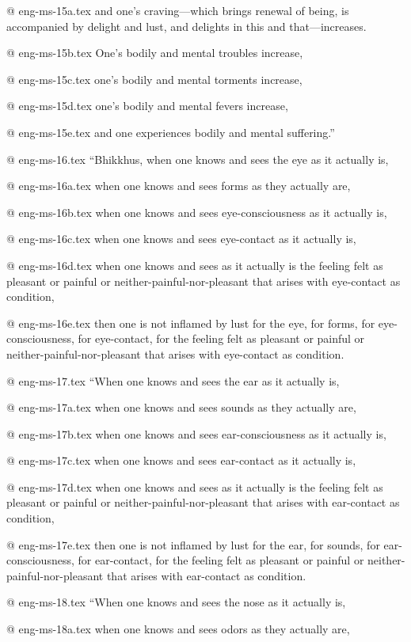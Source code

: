 @ eng-ms-15a.tex
and one’s craving—which brings renewal of being, is accompanied by delight and lust, and delights in this and that—increases.

@ eng-ms-15b.tex
One’s bodily and mental troubles increase,

@ eng-ms-15c.tex
one’s bodily and mental torments increase,

@ eng-ms-15d.tex
one’s bodily and mental fevers increase,

@ eng-ms-15e.tex
and one experiences bodily and mental suffering.”

@ eng-ms-16.tex
“Bhikkhus, when one knows and sees the eye as it actually is,

@ eng-ms-16a.tex
when one knows and sees forms as they actually are,

@ eng-ms-16b.tex
when one knows and sees eye-consciousness as it actually is,

@ eng-ms-16c.tex
when one knows and sees eye-contact as it actually is,

@ eng-ms-16d.tex
when one knows and sees as it actually is the feeling felt as pleasant or painful or neither-painful-nor-pleasant that arises with eye-contact as condition,

@ eng-ms-16e.tex
then one is not inflamed by lust for the eye, for forms, for eye-consciousness, for eye-contact, for the feeling felt as pleasant or painful or neither-painful-nor-pleasant that arises with eye-contact as condition.

@ eng-ms-17.tex
“When one knows and sees the ear as it actually is,

@ eng-ms-17a.tex
when one knows and sees sounds as they actually are,

@ eng-ms-17b.tex
when one knows and sees ear-consciousness as it actually is,

@ eng-ms-17c.tex
when one knows and sees ear-contact as it actually is,

@ eng-ms-17d.tex
when one knows and sees as it actually is the feeling felt as pleasant or painful or neither-painful-nor-pleasant that arises with ear-contact as condition,

@ eng-ms-17e.tex
then one is not inflamed by lust for the ear, for sounds, for ear-consciousness, for ear-contact, for the feeling felt as pleasant or painful or neither-painful-nor-pleasant that arises with ear-contact as condition.

@ eng-ms-18.tex
“When one knows and sees the nose as it actually is,

@ eng-ms-18a.tex
when one knows and sees odors as they actually are,

